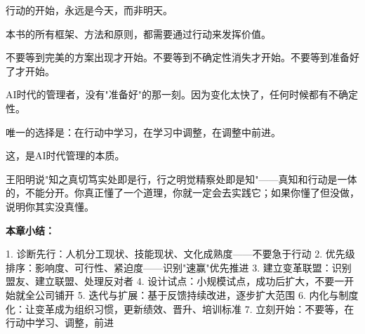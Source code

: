 行动的开始，永远是今天，而非明天。

本书的所有框架、方法和原则，都需要通过行动来发挥价值。

不要等到完美的方案出现才开始。不要等到不确定性消失才开始。不要等到准备好了才开始。

AI时代的管理者，没有"准备好"的那一刻。因为变化太快了，任何时候都有不确定性。

唯一的选择是：在行动中学习，在学习中调整，在调整中前进。

这，是AI时代管理的本质。

王阳明说"知之真切笃实处即是行，行之明觉精察处即是知"——真知和行动是一体的，不能分开。你真正懂了一个道理，你就一定会去实践它；如果你懂了但没做，说明你其实没真懂。


\textbf{本章小结：}

1. 诊断先行：人机分工现状、技能现状、文化成熟度——不要急于行动
2. 优先级排序：影响度、可行性、紧迫度——识别"速赢"优先推进
3. 建立变革联盟：识别盟友、建立联盟、处理反对者
4. 设计试点：小规模试点，成功后扩大，不要一开始就全公司铺开
5. 迭代与扩展：基于反馈持续改进，逐步扩大范围
6. 内化与制度化：让变革成为组织习惯，更新绩效、晋升、培训标准
7. 立刻开始：不要等，在行动中学习、调整，前进
